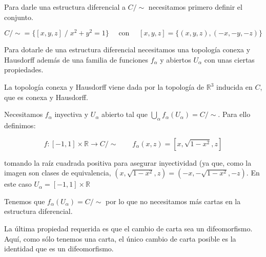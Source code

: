 \begin{problem}[6]
Para darle una estructura diferencial a $C/\sim$ necesitamos primero definir el conjunto.

\[
C/\sim = \{ [x,y,z] \;/\; x^2 + y^2 = 1 \}\quad \text{ con } \quad [x,y,z] = \{(x,y,z),(-x,-y,-z)\}
\]

Para dotarle de una estructura diferencial necesitamos una topología conexa y Hausdorff además de una familia de funciones $f_{\alpha}$ y abiertos $U_{\alpha}$ con unas ciertas propiedades.


La topología conexa y Hausdorff viene dada por la topología de $\mathbb{R}^3$ inducida en $C$, que es conexa y Hausdorff.


Necesitamos $f_{\alpha}$ inyectiva y $U_{\alpha}$ abierto tal que $\bigcup_{\alpha} f_{\alpha}(U_{\alpha}) = C/\sim$. Para ello definimos:


\[
f:[-1,1]×ℝ \longrightarrow C/\sim \quad \quad f_{\alpha}(x,z) =\left[x,\sqrt{1-x^2},z\right]
\]

tomando la raíz cuadrada positiva para asegurar inyectividad (ya que, como la imagen son clases de equivalencia, $(x,\sqrt{1-x^2},z) = (-x,-\sqrt{1-x^2},-z)$. En este caso $U_{\alpha} = [-1,1]×ℝ$

Tenemos que $f_{\alpha}(U_{\alpha}) = C/\sim$ por lo que no necesitamos más cartas en la estructura diferencial.


La última propiedad requerida es que el cambio de carta sea un difeomorfismo. Aquí, como sólo tenemos una carta, el único cambio de carta posible es la identidad que es un difeomorfismo.


\end{problem}

